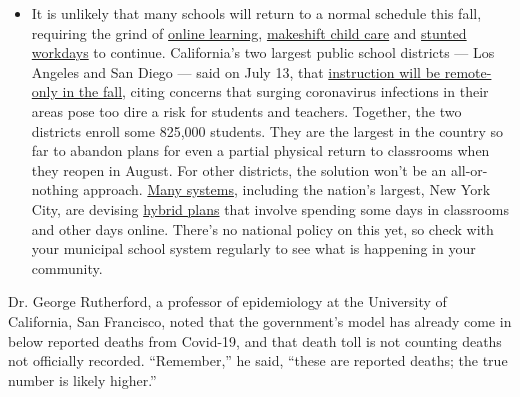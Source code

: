 \begin{itemize}
  \begin{itemize}
  \tightlist
  \item
    It is unlikely that many schools will return to a normal schedule
    this fall, requiring the grind of
    \href{https://www.nytimes3xbfgragh.onion/2020/06/05/us/coronavirus-education-lost-learning.html?action=click\&pgtype=Article\&state=default\&region=MAIN_CONTENT_3\&context=storylines_faq}{online
    learning},
    \href{https://www.nytimes3xbfgragh.onion/2020/05/29/us/coronavirus-child-care-centers.html?action=click\&pgtype=Article\&state=default\&region=MAIN_CONTENT_3\&context=storylines_faq}{makeshift
    child care} and
    \href{https://www.nytimes3xbfgragh.onion/2020/06/03/business/economy/coronavirus-working-women.html?action=click\&pgtype=Article\&state=default\&region=MAIN_CONTENT_3\&context=storylines_faq}{stunted
    workdays} to continue. California's two largest public school
    districts --- Los Angeles and San Diego --- said on July 13, that
    \href{https://www.nytimes3xbfgragh.onion/2020/07/13/us/lausd-san-diego-school-reopening.html?action=click\&pgtype=Article\&state=default\&region=MAIN_CONTENT_3\&context=storylines_faq}{instruction
    will be remote-only in the fall}, citing concerns that surging
    coronavirus infections in their areas pose too dire a risk for
    students and teachers. Together, the two districts enroll some
    825,000 students. They are the largest in the country so far to
    abandon plans for even a partial physical return to classrooms when
    they reopen in August. For other districts, the solution won't be an
    all-or-nothing approach.
    \href{https://bioethics.jhu.edu/research-and-outreach/projects/eschool-initiative/school-policy-tracker/}{Many
    systems}, including the nation's largest, New York City, are
    devising
    \href{https://www.nytimes3xbfgragh.onion/2020/06/26/us/coronavirus-schools-reopen-fall.html?action=click\&pgtype=Article\&state=default\&region=MAIN_CONTENT_3\&context=storylines_faq}{hybrid
    plans} that involve spending some days in classrooms and other days
    online. There's no national policy on this yet, so check with your
    municipal school system regularly to see what is happening in your
    community.
  \end{itemize}
\end{itemize}

Dr. George Rutherford, a professor of epidemiology at the University of
California, San Francisco, noted that the government's model has already
come in below reported deaths from Covid-19, and that death toll is not
counting deaths not officially recorded. ``Remember,'' he said, ``these
are reported deaths; the true number is likely higher.''

